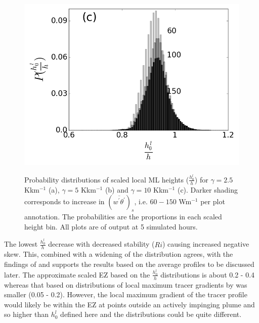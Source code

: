 \begin{figure}[htbp]
\begin{center}
{                \includegraphics[scale=.3]{figures/Scaled_ML_Height_hist_10}}\\      
\end{center}       

        \caption[Local Scaled ML Height Distributions]{Probability distributions of scaled local ML heights ($\frac{h^{l}_{0}}{h}$) for $\gamma = 2.5$ Kkm$^{-1}$ (a), $\gamma = 5$ Kkm$^{-1}$ (b) and $\gamma = 10$ Kkm$^{-1}$ (c). Darker shading corresponds to increase in $(\overline{w^{'}\theta^{'}})_{s}$, i.e. $60 - 150$ Wm$^{-1}$ per plot annotation.  The probabilities are the proportions in each scaled height bin. All plots are of output at 5 simulated hours.}
    
        \label{fig:localhdist}
\end{figure}

The lowest $\frac{h^{l}_{0}}{h}$ decrease with decreased stability ($Ri$) causing increased negative skew. This, combined with a widening of the distribution agrees, with the findings of \cite{SullMoengStev} and supports the results based on the average profiles to be discussed later.  The approximate scaled EZ based on the $\frac{h^{l}_{0}}{h}$ distributions is about 0.2 - 0.4 whereas that based on distributions of local maximum tracer gradients by  \cite{BrooksFowler2} was smaller (0.05 - 0.2).  However, the local maximum gradient of the tracer profile would likely be within the EZ at points outside an actively impinging plume and so higher than $h^{l}_{0}$ defined here and the distributions could be quite different. \\  

